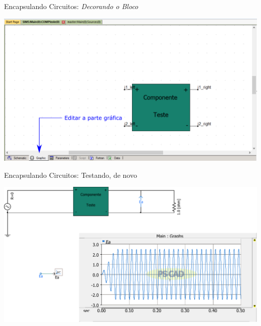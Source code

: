 \begin{frame}{Encapsulando Circuitos: {\it Decorando o Bloco}}
\centering


\includegraphics[width=0.75\linewidth]{./figuras/Componentes/grafica}


\end{frame}






\begin{frame}{Encapsulando Circuitos: Testando, de novo}
\centering


\includegraphics[width=0.75\linewidth]{./figuras/Componentes/Testando2}


\end{frame}



%
%
%
%
%
%
%
%
%
%
%
%
%
%
%
%




